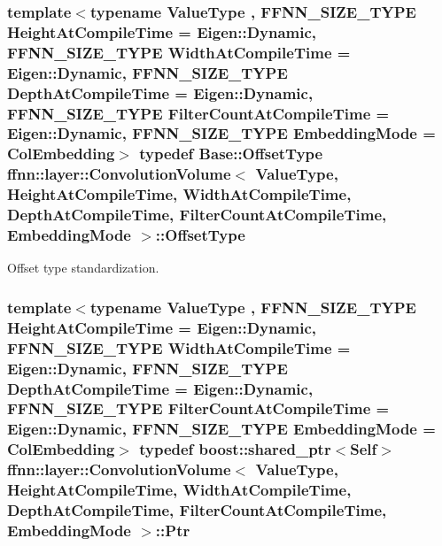 \hypertarget{classffnn_1_1layer_1_1_convolution_volume_ab283a25178a27af3d6162e5ca315c403}{
\subsubsection[{Offset\-Type}]{\setlength{\rightskip}{0pt plus 5cm}template$<$typename Value\-Type , F\-F\-N\-N\-\_\-\-S\-I\-Z\-E\-\_\-\-T\-Y\-P\-E Height\-At\-Compile\-Time = Eigen\-::\-Dynamic, F\-F\-N\-N\-\_\-\-S\-I\-Z\-E\-\_\-\-T\-Y\-P\-E Width\-At\-Compile\-Time = Eigen\-::\-Dynamic, F\-F\-N\-N\-\_\-\-S\-I\-Z\-E\-\_\-\-T\-Y\-P\-E Depth\-At\-Compile\-Time = Eigen\-::\-Dynamic, F\-F\-N\-N\-\_\-\-S\-I\-Z\-E\-\_\-\-T\-Y\-P\-E Filter\-Count\-At\-Compile\-Time = Eigen\-::\-Dynamic, F\-F\-N\-N\-\_\-\-S\-I\-Z\-E\-\_\-\-T\-Y\-P\-E Embedding\-Mode = Col\-Embedding$>$ typedef {\bf Base\-::\-Offset\-Type} {\bf ffnn\-::layer\-::\-Convolution\-Volume}$<$ Value\-Type, Height\-At\-Compile\-Time, Width\-At\-Compile\-Time, Depth\-At\-Compile\-Time, Filter\-Count\-At\-Compile\-Time, {\bf Embedding\-Mode} $>$\-::{\bf Offset\-Type}}}\label{classffnn_1_1layer_1_1_convolution_volume_ab283a25178a27af3d6162e5ca315c403}


Offset type standardization. 

\hypertarget{classffnn_1_1layer_1_1_convolution_volume_a34fd376bc786013ed79837acafae0645}{
\subsubsection[{Ptr}]{\setlength{\rightskip}{0pt plus 5cm}template$<$typename Value\-Type , F\-F\-N\-N\-\_\-\-S\-I\-Z\-E\-\_\-\-T\-Y\-P\-E Height\-At\-Compile\-Time = Eigen\-::\-Dynamic, F\-F\-N\-N\-\_\-\-S\-I\-Z\-E\-\_\-\-T\-Y\-P\-E Width\-At\-Compile\-Time = Eigen\-::\-Dynamic, F\-F\-N\-N\-\_\-\-S\-I\-Z\-E\-\_\-\-T\-Y\-P\-E Depth\-At\-Compile\-Time = Eigen\-::\-Dynamic, F\-F\-N\-N\-\_\-\-S\-I\-Z\-E\-\_\-\-T\-Y\-P\-E Filter\-Count\-At\-Compile\-Time = Eigen\-::\-Dynamic, F\-F\-N\-N\-\_\-\-S\-I\-Z\-E\-\_\-\-T\-Y\-P\-E Embedding\-Mode = Col\-Embedding$>$ typedef boost\-::shared\-\_\-ptr$<${\bf Self}$>$ {\bf ffnn\-::layer\-::\-Convolution\-Volume}$<$ Value\-Type, Height\-At\-Compile\-Time, Width\-At\-Compile\-Time, Depth\-At\-Compile\-Time, Filter\-Count\-At\-Compile\-Time, {\bf Embedding\-Mode} $>$\-::{\bf Ptr}}}\label{classffnn_1_1layer_1_1_convolution_volume_a34fd376bc786013ed79837acafae0645}



